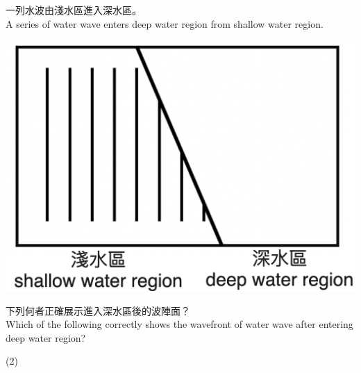 {


    一列水波由淺水區進入深水區。\\ A series of water wave enters deep water region from shallow water region.
    \par{\par\centering\includegraphics[width=.4\textwidth]{./img/ch2_weekend_mc_2024-05-31-18-35-31.png}\par}
    下列何者正確展示進入深水區後的波陣面？\\Which of the following correctly shows the wavefront of water wave after entering deep water region?
    \begin{tasks}(2)
        \task {}
        \task {}
        \task {}

\end{tasks}}
